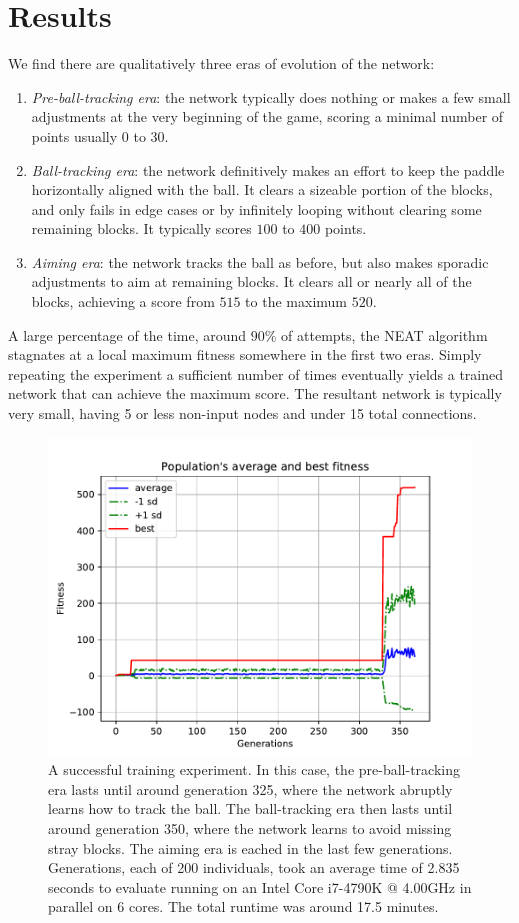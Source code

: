 \documentclass[letterpaper, twocolumn, conference]{article}
\begin{document}
\section{Results}
We find there are qualitatively three eras of evolution of the network:
\begin{enumerate}
    \item{}\emph{Pre-ball-tracking era}: the network typically does nothing or makes a few small adjustments at the very beginning of the game, scoring a minimal number of points usually $0$ to $30$.
    \item{}\emph{Ball-tracking era}: the network definitively makes an effort to keep the paddle horizontally aligned with the ball. It clears a sizeable portion of the blocks, and only fails in edge cases or by infinitely looping without clearing some remaining blocks. It typically scores $100$ to $400$ points.
    \item{}\emph{Aiming era}: the network tracks the ball as before, but also makes sporadic adjustments to aim at remaining blocks. It clears all or nearly all of the blocks, achieving a score from $515$ to the maximum $520$.
\end{enumerate}
A large percentage of the time, around $90\%$ of attempts, the NEAT algorithm stagnates at a local maximum
fitness somewhere in the first two eras.
Simply repeating the experiment a sufficient number of times eventually yields a trained network that
can achieve the maximum score.
The resultant network is typically very small, having 5 or less non-input nodes and under 15 total connections.
\begin{figure}[h!]
    \centering
    \includegraphics[width=.54 \textwidth]{avg_fitness.pdf}
    \caption{A successful training experiment. In this case, the pre-ball-tracking era lasts
        until around generation 325, where the network abruptly learns how to track the ball.
        The ball-tracking era then lasts until around generation 350, where the network learns to avoid missing stray blocks. The aiming era is eached in the last few generations. 
        Generations, each of 200 individuals, took an average time of 2.835 seconds to evaluate running on an
        Intel Core i7-4790K @ 4.00GHz in parallel on 6 cores. The total runtime was around 17.5 minutes.}
\end{figure}
\end{document}
